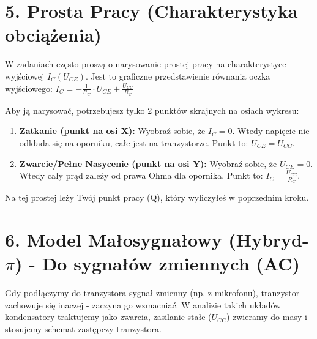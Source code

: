 \documentclass[11pt, a4paper]{article}
\begin{document}
\section*{5. Prosta Pracy (Charakterystyka obciążenia)}
W zadaniach często proszą o narysowanie prostej pracy na charakterystyce wyjściowej $I_C(U_{CE})$. Jest to graficzne przedstawienie równania oczka wyjściowego:
$I_C = -\frac{1}{R_C} \cdot U_{CE} + \frac{U_{CC}}{R_C}$

Aby ją narysować, potrzebujesz tylko 2 punktów skrajnych na osiach wykresu:
\begin{enumerate}
    \item \textbf{Zatkanie (punkt na osi X):} Wyobraź sobie, że $I_C = 0$. Wtedy napięcie nie odkłada się na oporniku, całe jest na tranzystorze. Punkt to: $U_{CE} = U_{CC}$.
    \item \textbf{Zwarcie/Pełne Nasycenie (punkt na osi Y):} Wyobraź sobie, że $U_{CE} = 0$. Wtedy cały prąd zależy od prawa Ohma dla opornika. Punkt to: $I_C = \frac{U_{CC}}{R_C}$.
\end{enumerate}

Na tej prostej leży Twój punkt pracy (Q), który wyliczyłeś w poprzednim kroku.

\begin{center}
\end{center}


\section*{6. Model Małosygnałowy (Hybryd-$\pi$) - Do sygnałów zmiennych (AC)}
Gdy podłączymy do tranzystora sygnał zmienny (np. z mikrofonu), tranzystor zachowuje się inaczej - zaczyna go wzmacniać. W analizie takich układów kondensatory traktujemy jako zwarcia, zasilanie stałe ($U_{CC}$) zwieramy do masy i stosujemy schemat zastępczy tranzystora.
\end{document}
